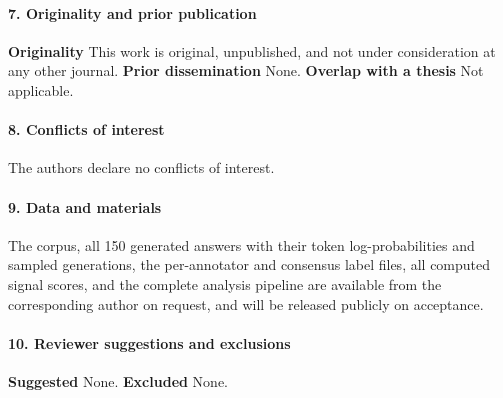 \documentclass[11pt,a4paper]{article}
\begin{document}
\paragraph{7. Originality and prior publication}
\textbf{Originality} This work is original, unpublished, and not under
consideration at any other journal.
\textbf{Prior dissemination} None.
\textbf{Overlap with a thesis} Not applicable.

\paragraph{8. Conflicts of interest}
The authors declare no conflicts of interest.

\paragraph{9. Data and materials}
The corpus, all 150 generated answers with their token log-probabilities and
sampled generations, the per-annotator and consensus label files, all computed
signal scores, and the complete analysis pipeline are available from the
corresponding author on request, and will be released publicly on acceptance.

\paragraph{10. Reviewer suggestions and exclusions}
\textbf{Suggested} None.
\textbf{Excluded} None.
\end{document}
